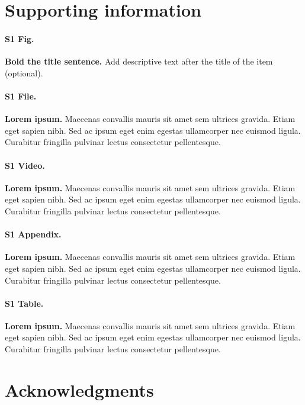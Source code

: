 \documentclass[10pt,letterpaper]{article}
\begin{document}
\section*{Supporting information}

\paragraph*{S1 Fig.}
\label{S1_Fig}
{\bf Bold the title sentence.} Add descriptive text after the title of the item (optional).
\paragraph*{S1 File.}
\label{S1_File}
{\bf Lorem ipsum.}  Maecenas convallis mauris sit amet sem ultrices gravida. Etiam eget sapien nibh. Sed ac ipsum eget enim egestas ullamcorper nec euismod ligula. Curabitur fringilla pulvinar lectus consectetur pellentesque.

\paragraph*{S1 Video.}
\label{S1_Video}
{\bf Lorem ipsum.}  Maecenas convallis mauris sit amet sem ultrices gravida. Etiam eget sapien nibh. Sed ac ipsum eget enim egestas ullamcorper nec euismod ligula. Curabitur fringilla pulvinar lectus consectetur pellentesque.

\paragraph*{S1 Appendix.}
\label{S1_Appendix}
{\bf Lorem ipsum.} Maecenas convallis mauris sit amet sem ultrices gravida. Etiam eget sapien nibh. Sed ac ipsum eget enim egestas ullamcorper nec euismod ligula. Curabitur fringilla pulvinar lectus consectetur pellentesque.

\paragraph*{S1 Table.}
\label{S1_Table}
{\bf Lorem ipsum.} Maecenas convallis mauris sit amet sem ultrices gravida. Etiam eget sapien nibh. Sed ac ipsum eget enim egestas ullamcorper nec euismod ligula. Curabitur fringilla pulvinar lectus consectetur pellentesque.

\section*{Acknowledgments}
\end{document}

